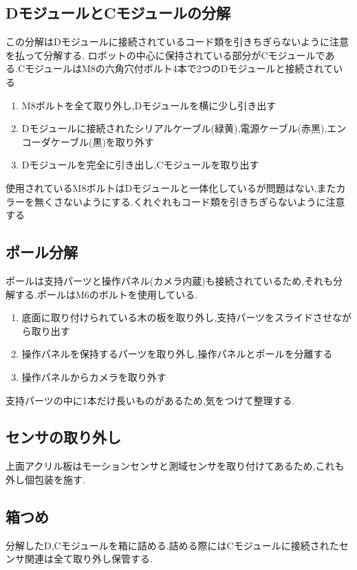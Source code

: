 \subsection{DモジュールとCモジュールの分解}
この分解はDモジュールに接続されているコード類を引きちぎらないように注意を払って分解する.
ロボットの中心に保持されている部分がCモジュールである.CモジュールはM8の六角穴付ボルト4本で2つのDモジュールと接続されている
\begin{enumerate}
 \item M8ボルトを全て取り外し,Dモジュールを横に少し引き出す
 \item Dモジュールに接続されたシリアルケーブル(緑黄),電源ケーブル(赤黒),エンコーダケーブル(黒)を取り外す
 \item Dモジュールを完全に引き出し,Cモジュールを取り出す
\end{enumerate}
使用されているM8ボルトはDモジュールと一体化しているが問題はない,またカラーを無くさないようにする.くれぐれもコード類を引きちぎらないように注意する

\subsection{ポール分解}
ポールは支持パーツと操作パネル(カメラ内蔵)も接続されているため,それも分解する.ポールはM6のボルトを使用している.
\begin{enumerate}
 \item 底面に取り付けられている木の板を取り外し,支持パーツをスライドさせながら取り出す
 \item 操作パネルを保持するパーツを取り外し,操作パネルとポールを分離する 
 \item 操作パネルからカメラを取り外す
\end{enumerate}
支持パーツの中に1本だけ長いものがあるため,気をつけて整理する.

\subsection{センサの取り外し}
上面アクリル板はモーションセンサと測域センサを取り付けてあるため,これも外し個包装を施す.

\subsection{箱つめ}
分解したD,Cモジュールを箱に詰める.詰める際にはCモジュールに接続されたセンサ関連は全て取り外し保管する.

